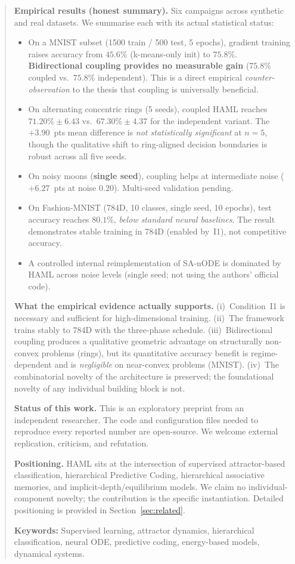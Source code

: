 \documentclass[11pt,a4paper]{article}
\begin{document}
\begin{abstract}
\textbf{Empirical results (honest summary).}
Six campaigns across synthetic and real datasets. We summarise each with its actual
statistical status:
\begin{itemize}
  \item On a MNIST subset (1500 train / 500 test, 5 epochs), gradient training raises
        accuracy from $45.6\%$ (k-means-only init) to $75.8\%$. \textbf{Bidirectional
        coupling provides no measurable gain} ($75.8\%$ coupled vs.\ $75.8\%$
        independent). This is a direct empirical \emph{counter-observation} to the
        thesis that coupling is universally beneficial.
  \item On alternating concentric rings (5 seeds), coupled HAML reaches
        $71.20\% \pm 6.43$ vs.\ $67.30\% \pm 4.37$ for the independent variant. The
        $+3.90$~pts mean difference is \emph{not statistically significant} at $n=5$,
        though the qualitative shift to ring-aligned decision boundaries is robust
        across all five seeds.
  \item On noisy moons (\textbf{single seed}), coupling helps at intermediate noise
        ($+6.27$~pts at noise $0.20$). Multi-seed validation pending.
  \item On Fashion-MNIST (784D, 10 classes, single seed, 10 epochs), test accuracy
        reaches $80.1\%$, \emph{below standard neural baselines}. The result
        demonstrates stable training in 784D (enabled by~I1), not competitive accuracy.
  \item A controlled internal reimplementation of SA-nODE is dominated by HAML across
        noise levels (single seed; not using the authors' official code).
\end{itemize}

\textbf{What the empirical evidence actually supports.}
(i)~Condition~I1 is necessary and sufficient for high-dimensional training. (ii)~The
framework trains stably to 784D with the three-phase schedule. (iii)~Bidirectional
coupling produces a qualitative geometric advantage on structurally non-convex problems
(rings), but its quantitative accuracy benefit is regime-dependent and is
\emph{negligible} on near-convex problems (MNIST). (iv)~The combinatorial novelty of
the architecture is preserved; the foundational novelty of any individual building
block is not.

\textbf{Status of this work.} This is an exploratory preprint from an independent
researcher. The code and configuration files needed to reproduce every reported number
are open-source. We welcome external replication, criticism, and refutation.

\textbf{Positioning.} HAML sits at the intersection of supervised attractor-based
classification, hierarchical Predictive Coding, hierarchical associative memories, and
implicit-depth/equilibrium models. We claim no individual-component novelty; the
contribution is the specific instantiation. Detailed positioning is provided in
Section~\ref{sec:related}.

\textbf{Keywords:} Supervised learning, attractor dynamics, hierarchical classification,
neural ODE, predictive coding, energy-based models, dynamical systems.
\end{abstract}
\end{document}
